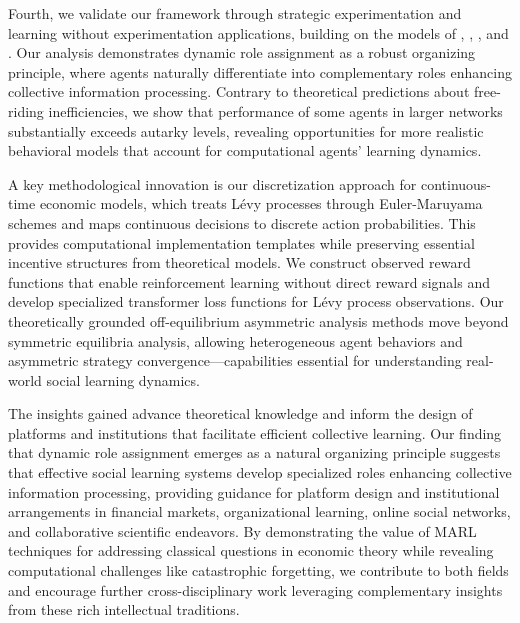 Fourth, we validate our framework through strategic experimentation and learning without experimentation applications, building on the models of \citet{bolton1999strategic}, \citet{keller2020undiscounted}, \citet{huang2024learning}, and \citet{brandl2024}. Our analysis demonstrates dynamic role assignment as a robust organizing principle, where agents naturally differentiate into complementary roles enhancing collective information processing. Contrary to theoretical predictions about free-riding inefficiencies, we show that performance of some agents in larger networks substantially exceeds autarky levels, revealing opportunities for more realistic behavioral models that account for computational agents' learning dynamics.

A key methodological innovation is our discretization approach for continuous-time economic models, which treats Lévy processes through Euler-Maruyama schemes and maps continuous decisions to discrete action probabilities. This provides computational implementation templates while preserving essential incentive structures from theoretical models. We construct observed reward functions that enable reinforcement learning without direct reward signals and develop specialized transformer loss functions for Lévy process observations. Our theoretically grounded off-equilibrium asymmetric analysis methods move beyond symmetric equilibria analysis, allowing heterogeneous agent behaviors and asymmetric strategy convergence—capabilities essential for understanding real-world social learning dynamics.

The insights gained advance theoretical knowledge and inform the design of platforms and institutions that facilitate efficient collective learning. Our finding that dynamic role assignment emerges as a natural organizing principle suggests that effective social learning systems develop specialized roles enhancing collective information processing, providing guidance for platform design and institutional arrangements in financial markets, organizational learning, online social networks, and collaborative scientific endeavors. By demonstrating the value of MARL techniques for addressing classical questions in economic theory while revealing computational challenges like catastrophic forgetting, we contribute to both fields and encourage further cross-disciplinary work leveraging complementary insights from these rich intellectual traditions.

